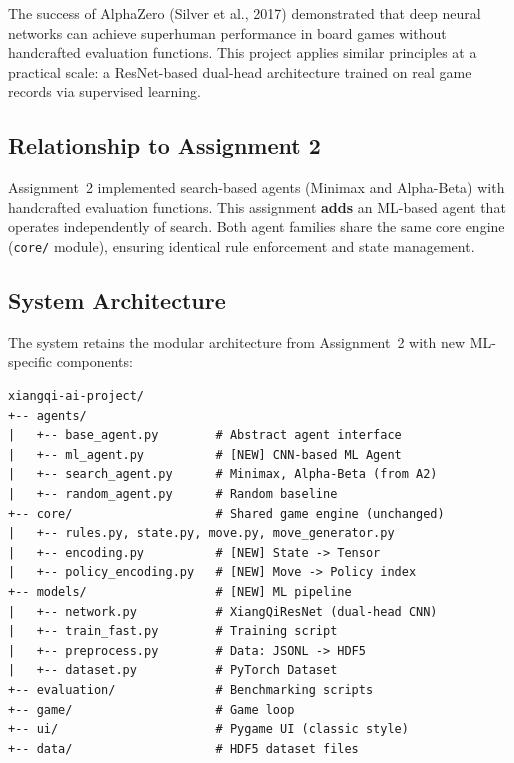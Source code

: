 \documentclass[a4paper,12pt]{article}
\begin{document}
The success of AlphaZero (Silver et al., 2017) demonstrated that deep neural networks can achieve superhuman performance in board games without handcrafted evaluation functions. This project applies similar principles at a practical scale: a ResNet-based dual-head architecture trained on real game records via supervised learning.

\subsection{Relationship to Assignment 2}

Assignment~2 implemented search-based agents (Minimax and Alpha-Beta) with handcrafted evaluation functions. This assignment \textbf{adds} an ML-based agent that operates independently of search. Both agent families share the same core engine (\texttt{core/} module), ensuring identical rule enforcement and state management.

\subsection{System Architecture}

The system retains the modular architecture from Assignment~2 with new ML-specific components:

\begin{verbatim}
xiangqi-ai-project/
+-- agents/
|   +-- base_agent.py        # Abstract agent interface
|   +-- ml_agent.py          # [NEW] CNN-based ML Agent
|   +-- search_agent.py      # Minimax, Alpha-Beta (from A2)
|   +-- random_agent.py      # Random baseline
+-- core/                    # Shared game engine (unchanged)
|   +-- rules.py, state.py, move.py, move_generator.py
|   +-- encoding.py          # [NEW] State -> Tensor
|   +-- policy_encoding.py   # [NEW] Move -> Policy index
+-- models/                  # [NEW] ML pipeline
|   +-- network.py           # XiangQiResNet (dual-head CNN)
|   +-- train_fast.py        # Training script
|   +-- preprocess.py        # Data: JSONL -> HDF5
|   +-- dataset.py           # PyTorch Dataset
+-- evaluation/              # Benchmarking scripts
+-- game/                    # Game loop
+-- ui/                      # Pygame UI (classic style)
+-- data/                    # HDF5 dataset files
\end{verbatim}

\end{document}
